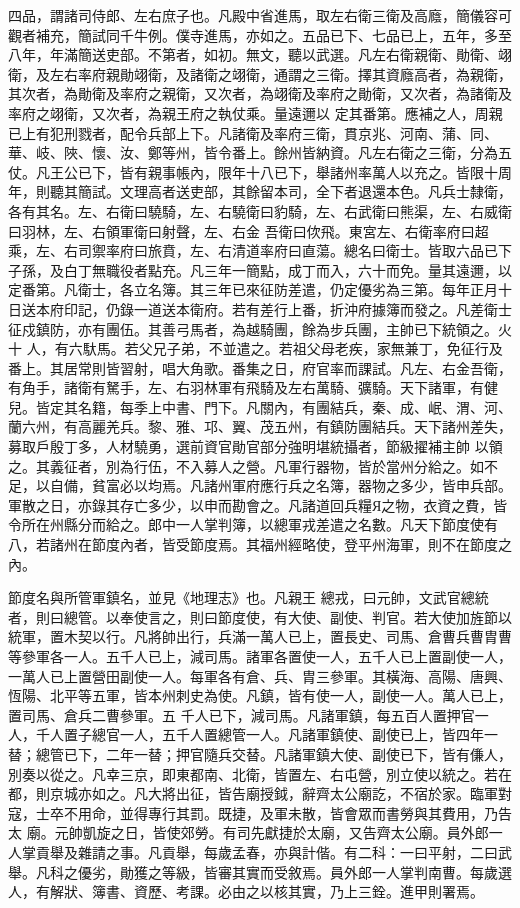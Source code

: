 \begin{pinyinscope}
 四品，謂諸司侍郎、左右庶子也。凡殿中省進馬，取左右衛三衛及高廕，簡儀容可觀者補充，簡試同千牛例。僕寺進馬，亦如之。五品已下、七品已上，五年，多至八年，年滿簡送吏部。不第者，如初。無文，聽以武選。凡左右衛親衛、勛衛、翊衛，及左右率府親勛翊衛，及諸衛之翊衛，通謂之三衛。擇其資廕高者，為親衛，其次者，為勛衛及率府之親衛，又次者，為翊衛及率府之勛衛，又次者，為諸衛及率府之翊衛，又次者，為親王府之執仗乘。量遠邇以
 定其番第。應補之人，周親已上有犯刑戮者，配令兵部上下。凡諸衛及率府三衛，貫京兆、河南、蒲、同、華、岐、陜、懷、汝、鄭等州，皆令番上。餘州皆納資。凡左右衛之三衛，分為五仗。凡王公已下，皆有親事帳內，限年十八已下，舉諸州率萬人以充之。皆限十周年，則聽其簡試。文理高者送吏部，其餘留本司，全下者退還本色。凡兵士隸衛，各有其名。左、右衛曰驍騎，左、右驍衛曰豹騎，左、右武衛曰熊渠，左、右威衛曰羽林，左、右領軍衛曰射聲，左、右金
 吾衛曰佽飛。東宮左、右衛率府曰超乘，左、右司禦率府曰旅賁，左、右清道率府曰直蕩。總名曰衛士。皆取六品已下子孫，及白丁無職役者點充。凡三年一簡點，成丁而入，六十而免。量其遠邇，以定番第。凡衛士，各立名簿。其三年已來征防差遣，仍定優劣為三第。每年正月十日送本府印記，仍錄一道送本衛府。若有差行上番，折沖府據簿而發之。凡差衛士征戍鎮防，亦有團伍。其善弓馬者，為越騎團，餘為步兵團，主帥已下統領之。火十
 人，有六馱馬。若父兄子弟，不並遣之。若祖父母老疾，家無兼丁，免征行及番上。其居常則皆習射，唱大角歌。番集之日，府官率而課試。凡左、右金吾衛，有角手，諸衛有駑手，左、右羽林軍有飛騎及左右萬騎、彍騎。天下諸軍，有健兒。皆定其名籍，每季上中書、門下。凡關內，有團結兵，秦、成、岷、渭、河、蘭六州，有高麗羌兵。黎、雅、邛、翼、茂五州，有鎮防團結兵。天下諸州差失，募取戶殷丁多，人材驍勇，選前資官勛官部分強明堪統攝者，節級擢補主帥
 以領之。其義征者，別為行伍，不入募人之營。凡軍行器物，皆於當州分給之。如不足，以自備，貧富必以均焉。凡諸州軍府應行兵之名簿，器物之多少，皆申兵部。軍散之日，亦錄其存亡多少，以申而勘會之。凡諸道回兵糧Я之物，衣資之費，皆令所在州縣分而給之。郎中一人掌判簿，以總軍戎差遣之名數。凡天下節度使有八，若諸州在節度內者，皆受節度焉。其福州經略使，登平州海軍，則不在節度之內。



 節度名與所管軍鎮名，並見《地理志》也。凡親王
 總戎，曰元帥，文武官總統者，則曰總管。以奉使言之，則曰節度使，有大使、副使、判官。若大使加旌節以統軍，置木契以行。凡將帥出行，兵滿一萬人已上，置長史、司馬、倉曹兵曹胄曹等參軍各一人。五千人已上，減司馬。諸軍各置使一人，五千人已上置副使一人，一萬人已上置營田副使一人。每軍各有倉、兵、胄三參軍。其橫海、高陽、唐興、恆陽、北平等五軍，皆本州刺史為使。凡鎮，皆有使一人，副使一人。萬人已上，置司馬、倉兵二曹參軍。五
 千人已下，減司馬。凡諸軍鎮，每五百人置押官一人，千人置子總官一人，五千人置總管一人。凡諸軍鎮使、副使已上，皆四年一替；總管已下，二年一替；押官隨兵交替。凡諸軍鎮大使、副使已下，皆有傔人，別奏以從之。凡幸三京，即東都南、北衛，皆置左、右屯營，別立使以統之。若在都，則京城亦如之。凡大將出征，皆告廟授鉞，辭齊太公廟訖，不宿於家。臨軍對寇，士卒不用命，並得專行其罰。既捷，及軍未散，皆會眾而書勞與其費用，乃告太
 廟。元帥凱旋之日，皆使郊勞。有司先獻捷於太廟，又告齊太公廟。員外郎一人掌貢舉及雜請之事。凡貢舉，每歲孟春，亦與計偕。有二科：一曰平射，二曰武舉。凡科之優劣，勛獲之等級，皆審其實而受敘焉。員外郎一人掌判南曹。每歲選人，有解狀、簿書、資歷、考課。必由之以核其實，乃上三銓。進甲則署焉。




\end{pinyinscope}
